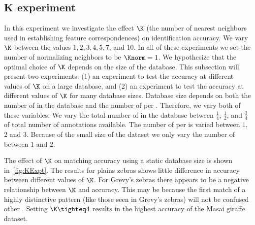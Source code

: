     \subsection{K experiment}\label{sub:exptk}  

        In this experiment we investigate the effect $\K$ (the number
          of nearest neighbors used in establishing feature
          correspondences) on identification accuracy.
        We vary $\K$ between the values $1, 2, 3, 4, 5, 7$, and $10$.
        In all of these experiments we set the number of normalizing
          neighbors to be $\Knorm=1$.
        We hypothesize that the optimal choice of $\K$ depends on the
          size of the database.
        This subsection will present two experiments:
        (1) an experiment to test the accuracy at different values of
          $\K$ on a large database, and
        (2) an experiment to test the accuracy at different values of
          $\K$ for many database sizes.
        Database size depends on both the number of \names{} in the
          database and the number of \exemplars{} per \name{}.
        Therefore, we vary both of these variables.
        We vary the total number of \exemplars{} in the database
          between $\frac{1}{4}$, $\frac{1}{2}$, and $\frac{3}{4}$ of
          total number of annotations available.
        The number of \exemplars{} per \name{} is varied between $1$,
          $2$ and $3$.
        Because of the small size of the \girmmasterI{} dataset we only
          vary the number of \exemplars{} between $1$ and $2$.

        The effect of $\K$ on matching accuracy using a static database
          size is shown in~\cref{fig:KExpt}.
        The results for plains zebras shows little difference in
          accuracy between different values of $\K$.
        For Grevy's zebras there appears to be a negative relationship
          between $\K$ and accuracy.
        This may be because the first match of a highly distinctive
          pattern (like those seen in Grevy's zebras) will not be
          confused other \names{}.
        Setting $\K\tighteq4$ results in the highest accuracy of the
          Masai giraffe dataset.

        \KExpt{}
        
